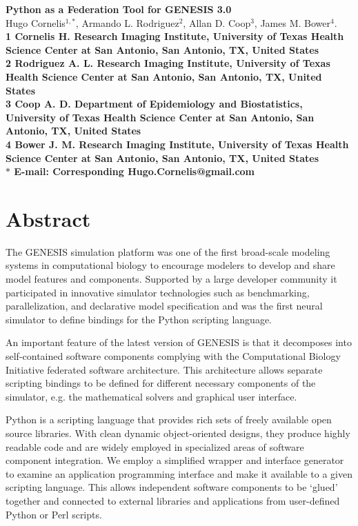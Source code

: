 \documentclass[10pt]{article}
\date{}
\begin{document}
\begin{flushleft}
{\Large
\textbf{Python as a Federation Tool for GENESIS 3.0}
}
\\
Hugo Cornelis$^{1,\ast}$, 
Armando L. Rodriguez$^{2}$, 
Allan D. Coop$^{3}$,
James M. Bower$^{4}$.
\\
\bf{1} Cornelis H. Research Imaging Institute, University of Texas Health Science Center at San Antonio, San Antonio, TX, United States
\\
\bf{2} Rodriguez A. L. Research Imaging Institute, University of Texas Health Science Center at San Antonio, San Antonio, TX, United States
\\
\bf{3} Coop A. D. Department of Epidemiology and Biostatistics, University of Texas Health Science Center at San Antonio, San Antonio, TX, United States
\\
\bf{4} Bower J. M. Research Imaging Institute, University of Texas Health Science Center at San Antonio, San Antonio, TX, United States
\\
$\ast$ E-mail: Corresponding Hugo.Cornelis@gmail.com
\end{flushleft}

\section*{\LARGE Abstract}

The GENESIS simulation platform was one of the first
broad-scale modeling systems in computational biology to encourage
modelers to develop and share model features and components.
Supported by a large developer community it
participated in innovative simulator technologies such as
benchmarking, parallelization, and declarative model specification and was the first neural simulator to define bindings for the Python scripting language.

An important feature of the latest version of GENESIS is
that it decomposes into self-contained software components
complying with the Computational Biology Initiative federated software
architecture.  This architecture allows separate scripting bindings to be
defined for different necessary components of the simulator, e.g. the mathematical solvers and graphical user interface.

Python is a scripting language that provides rich sets of
freely available open source libraries. With clean dynamic object-oriented
designs, they produce highly readable
code and are widely employed in specialized areas of
software component integration. We employ a simplified wrapper and interface generator to examine an application
programming interface and make it available to a given scripting
language.  This allows independent software components
to be `glued' together and connected to
external libraries and applications from user-defined Python or Perl scripts.
\end{document}
